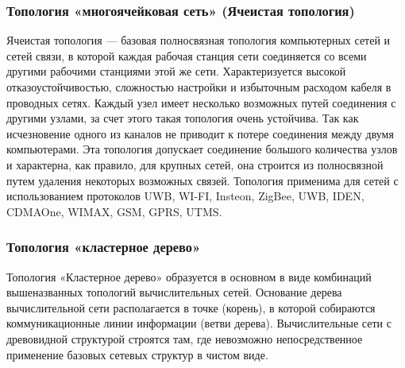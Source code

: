 \documentclass[a4paper,12pt]{article}
\begin{document}
\subsubsection{Топология «многоячейковая сеть» (Ячеистая топология)}
Ячеистая топология — базовая полносвязная топология компьютерных сетей и сетей связи, в которой каждая рабочая станция сети соединяется со всеми другими рабочими станциями этой же сети. Характеризуется высокой отказоустойчивостью, сложностью настройки и избыточным расходом кабеля в проводных сетях. Каждый узел имеет несколько возможных путей соединения с другими узлами, за счет этого такая топология очень устойчива. Так как исчезновение одного из каналов не приводит к потере соединения между двумя компьютерами. Эта топология допускает соединение большого количества узлов и характерна, как правило, для крупных сетей, она строится из полносвязной путем удаления некоторых возможных связей.
Топология применима для сетей с использованием протоколов UWB, WI-FI, Insteon, ZigBee, UWB, IDEN, CDMAOne, WIMAX, GSM, GPRS, UTMS.

\subsubsection{Топология «кластерное дерево»}
Топология «Кластерное дерево» образуется в основном в виде комбинаций вышеназванных топологий вычислительных сетей. Основание дерева вычислительной сети располагается в точке (корень), в которой собираются коммуникационные линии информации (ветви дерева).
Вычислительные сети с древовидной структурой строятся там, где невозможно непосредственное применение базовых сетевых структур в чистом виде.
\end{document}

